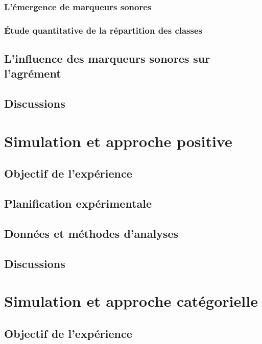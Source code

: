 \subsubsection{L'émergence de marqueurs sonores}

\subsubsection{Étude quantitative de la répartition des classes}

\subsection{L'influence des marqueurs sonores sur l'agrément}

\subsection{Discussions}

\section{Simulation et approche positive}

\subsection{Objectif de l'expérience}

\subsection{Planification expérimentale}

\subsection{Données et méthodes d'analyses}

\subsection{Discussions}

\section{Simulation et approche catégorielle}

\subsection{Objectif de l'expérience}

